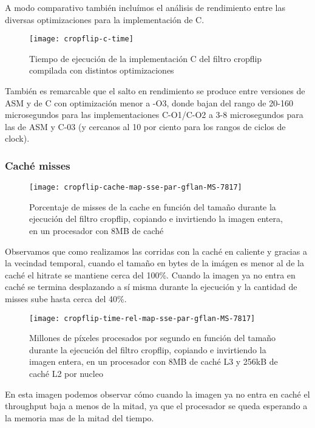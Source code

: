 A modo comparativo también incluímos el análisis de rendimiento entre las diversas optimizaciones para la implementación de C.

\begin{figure}[H]
\centering
\texttt{[image: cropflip-c-time]}
\label{fig:cropflip-c-time}
\caption{Tiempo de ejecución de la implementación C del filtro cropflip compilada con distintos optimizaciones}
\end{figure}

También es remarcable que el salto en rendimiento se produce entre versiones de ASM y de C con optimización menor a -O3, donde bajan del rango de 20-160 microsegundos para las implementaciones C-O1/C-O2 a 3-8 microsegundos para las de ASM y C-03 (y cercanos al 10 por ciento para los rangos de ciclos de clock).

\subsubsection{Caché misses}

\begin{figure}[H]
\centering
\texttt{[image: cropflip-cache-map-sse-par-gflan-MS-7817]}
\caption{Porcentaje de misses de la cache en función del tamaño durante la ejecución del filtro cropflip, copiando e invirtiendo la imagen entera, en un procesador con 8MB de caché}
\label{fig:cropflip-cache-map-sse_par-gflan-MS-7817}
\end{figure}


Observamos que como realizamos las corridas con la caché en caliente y gracias a la vecindad temporal, cuando el tamaño en bytes de la imágen es menor al de la caché el hitrate se mantiene cerca del 100\%. Cuando la imagen ya no entra en caché se termina desplazando a sí misma durante la ejecución y la cantidad de misses sube hasta cerca del 40\%.

\begin{figure}[H]
\centering
\texttt{[image: cropflip-time-rel-map-sse-par-gflan-MS-7817]}
\caption{Millones de píxeles procesados por segundo en función del tamaño durante la ejecución del filtro cropflip, copiando e invirtiendo la imagen entera, en un procesador con 8MB de caché L3 y 256kB de caché L2 por nucleo}
\label{fig:cropflip-tame-rel-map-sse_par-gflan-MS-7817}
\end{figure}

En esta imagen podemos observar cómo cuando la imagen ya no entra en caché el throughput baja a menos de la mitad, ya que el procesador se queda esperando a la memoria mas de la mitad del tiempo.

